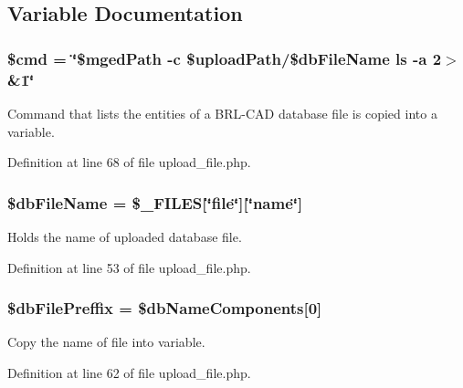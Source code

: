 \subsection{Variable Documentation}
\hypertarget{upload__file_8php_a9c87033fa49b61f753e3c263da5edeab}{
\subsubsection[{\$cmd}]{\setlength{\rightskip}{0pt plus 5cm}\$cmd = \char`\"{}\$mged\-Path -\/c \$upload\-Path/\$db\-File\-Name ls -\/a 2$>$\&1\char`\"{}}}\label{upload__file_8php_a9c87033fa49b61f753e3c263da5edeab}
Command that lists the entities of a B\-R\-L-\/\-C\-A\-D database file is copied into a variable. 

Definition at line 68 of file upload\-\_\-file.\-php.

\hypertarget{upload__file_8php_ab20da318c11da52be7a0bd751aa80ba2}{
\subsubsection[{\$db\-File\-Name}]{\setlength{\rightskip}{0pt plus 5cm}\$db\-File\-Name = \$\-\_\-\-F\-I\-L\-E\-S\mbox{[}\char`\"{}file\char`\"{}\mbox{]}\mbox{[}\char`\"{}name\char`\"{}\mbox{]}}}\label{upload__file_8php_ab20da318c11da52be7a0bd751aa80ba2}
Holds the name of uploaded database file. 

Definition at line 53 of file upload\-\_\-file.\-php.

\hypertarget{upload__file_8php_ad2ec2b4b4d7f2f14d90fa0a87387c143}{
\subsubsection[{\$db\-File\-Preffix}]{\setlength{\rightskip}{0pt plus 5cm}\$db\-File\-Preffix = \$db\-Name\-Components\mbox{[}0\mbox{]}}}\label{upload__file_8php_ad2ec2b4b4d7f2f14d90fa0a87387c143}
Copy the name of file into variable. 

Definition at line 62 of file upload\-\_\-file.\-php.

